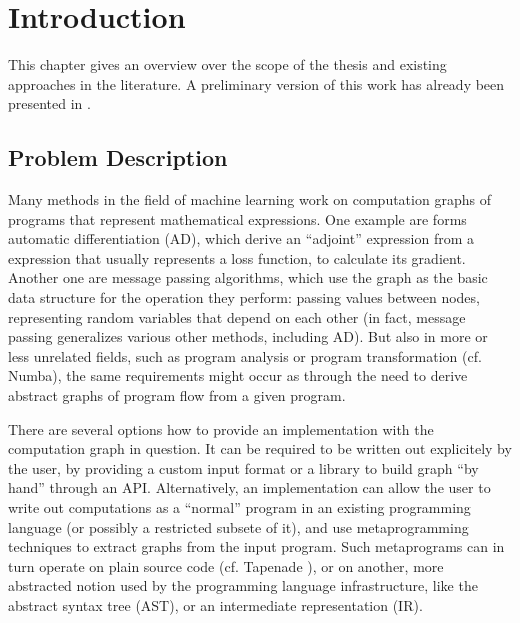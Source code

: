 \chapter{Introduction}
\label{cha:introduction}

This chapter gives an overview over the scope of the thesis and existing approaches in the
literature.  A preliminary version of this work has already been presented in
\cite{gabler2019graph}.

\section{Problem Description}
\label{sec:problem-description}

Many methods in the field of machine learning work on computation graphs of programs that represent
mathematical expressions.  One example are forms automatic differentiation (AD), which derive an
\enquote{adjoint} expression from a expression that usually represents a loss function, to calculate
its gradient.  Another one are message passing algorithms, which use the graph as the basic data
structure for the operation they perform: passing values between nodes, representing random
variables that depend on each other (in fact, message passing generalizes various other methods,
including AD).  But also in more or less unrelated fields, such as program analysis or program
transformation (cf. Numba), the same requirements might occur as through the need to
derive abstract graphs of program flow from a given program.

There are several options how to provide an implementation with the computation graph in question.
It can be required to be written out explicitely by the user, by providing a custom input
format or a library to build graph \enquote{by hand} through an API.  Alternatively, an implementation can allow the user to write out
computations as a \enquote{normal} program in an existing programming language (or possibly a
restricted subsete of it), and use metaprogramming techniques to extract graphs from the input
program.  Such metaprograms can in turn operate on plain source code (cf. Tapenade
\cite{tapenadedevelopers2019tapenade}), or on another, more abstracted notion used by the
programming language infrastructure, like the abstract syntax tree (AST), or an intermediate
representation (IR).

